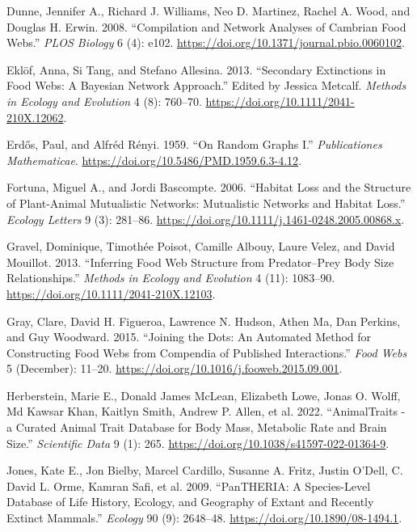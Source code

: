 \documentclass[
  letterpaper,
  DIV=11,
  numbers=noendperiod]{scrartcl}
\newlength{\cslhangindent}
\newenvironment{CSLReferences}[2] %
 {\begin{list}{}{%
  \setlength{\itemindent}{0pt}
  \setlength{\leftmargin}{0pt}
  \setlength{\parsep}{0pt}
  \ifodd #1
   \setlength{\leftmargin}{\cslhangindent}
   \setlength{\itemindent}{-1\cslhangindent}
  \fi
  \setlength{\itemsep}{#2\baselineskip}}}
 {\end{list}}
\begin{document}
\begin{CSLReferences}{1}{0}
Dunne, Jennifer A., Richard J. Williams, Neo D. Martinez, Rachel A.
Wood, and Douglas H. Erwin. 2008. {``Compilation and {Network Analyses}
of {Cambrian Food Webs}.''} \emph{PLOS Biology} 6 (4): e102.
\url{https://doi.org/10.1371/journal.pbio.0060102}.

Eklöf, Anna, Si Tang, and Stefano Allesina. 2013. {``Secondary
Extinctions in Food Webs: A {Bayesian} Network Approach.''} Edited by
Jessica Metcalf. \emph{Methods in Ecology and Evolution} 4 (8): 760--70.
\url{https://doi.org/10.1111/2041-210X.12062}.

Erdős, Paul, and Alfréd Rényi. 1959. {``On {Random Graphs I}.''}
\emph{Publicationes Mathematicae}.
\url{https://doi.org/10.5486/PMD.1959.6.3-4.12}.

Fortuna, Miguel A., and Jordi Bascompte. 2006. {``Habitat Loss and the
Structure of Plant-Animal Mutualistic Networks: {Mutualistic} Networks
and Habitat Loss.''} \emph{Ecology Letters} 9 (3): 281--86.
\url{https://doi.org/10.1111/j.1461-0248.2005.00868.x}.

Gravel, Dominique, Timothée Poisot, Camille Albouy, Laure Velez, and
David Mouillot. 2013. {``Inferring Food Web Structure from
Predator--Prey Body Size Relationships.''} \emph{Methods in Ecology and
Evolution} 4 (11): 1083--90.
\url{https://doi.org/10.1111/2041-210X.12103}.

Gray, Clare, David H. Figueroa, Lawrence N. Hudson, Athen Ma, Dan
Perkins, and Guy Woodward. 2015. {``Joining the Dots: {An} Automated
Method for Constructing Food Webs from Compendia of Published
Interactions.''} \emph{Food Webs} 5 (December): 11--20.
\url{https://doi.org/10.1016/j.fooweb.2015.09.001}.

Herberstein, Marie E., Donald James McLean, Elizabeth Lowe, Jonas O.
Wolff, Md Kawsar Khan, Kaitlyn Smith, Andrew P. Allen, et al. 2022.
{``{AnimalTraits} - a Curated Animal Trait Database for Body Mass,
Metabolic Rate and Brain Size.''} \emph{Scientific Data} 9 (1): 265.
\url{https://doi.org/10.1038/s41597-022-01364-9}.

Jones, Kate E., Jon Bielby, Marcel Cardillo, Susanne A. Fritz, Justin
O'Dell, C. David L. Orme, Kamran Safi, et al. 2009. {``{PanTHERIA}: A
Species-Level Database of Life History, Ecology, and Geography of Extant
and Recently Extinct Mammals.''} \emph{Ecology} 90 (9): 2648--48.
\url{https://doi.org/10.1890/08-1494.1}.


\end{CSLReferences}
\end{document}
